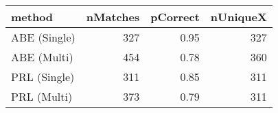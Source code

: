 \begin{tabular}{lrrr}
  \toprule
method & nMatches & pCorrect & nUniqueX \\ 
  \midrule
ABE (Single) & 327 & 0.95 & 327 \\ 
  ABE (Multi) & 454 & 0.78 & 360 \\ 
  PRL (Single) & 311 & 0.85 & 311 \\ 
  PRL (Multi) & 373 & 0.79 & 311 \\ 
   \bottomrule
\end{tabular}
